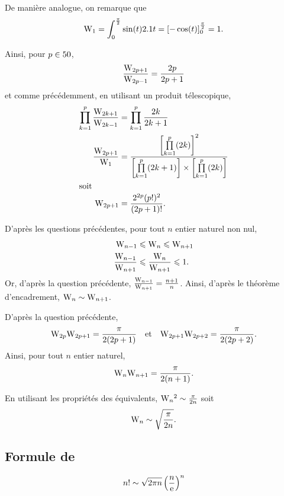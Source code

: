 \begin{solution}
\begin{reponses}
\item De manière analogue, on remarque que
\[
\mathrm{W}_1
= \int_0^{\frac{\pi}{2}} \sin(t) 2.1 t
= \left[-\cos(t)\right]_0^{\frac{\pi}{2}}
= 1.
\]

Ainsi, pour $p \in 50$,
\[
\frac{\mathrm{W}_{2p+1}}{\mathrm{W}_{2p-1}} = \frac{2p}{2p+1}
\]
et comme précédemment, en utilisant un produit télescopique, 
\begin{align*}
\prod_{k=1}^p \frac{\mathrm{W}_{2k+1}}{\mathrm{W}_{2k-1}} &= \prod_{k=1}^p \frac{2k}{2k+1}\\
\frac{\mathrm{W}_{2p+1}}{\mathrm{W}_1} &= \frac{\left[\prod\limits_{k=1}^p (2k)\right]^2}{\left[\prod\limits_{k=1}^p (2k+1)\right] \times \left[\prod\limits_{k=1}^p (2k)\right]}\\
\intertext{soit}
\mathrm{W}_{2p+1} &= \frac{2^{2p} (p!)^2}{(2p+1)!}.
\end{align*}

\item D'après les questions précédentes, pour tout $n$ entier naturel non nul,
\begin{align*}
\mathrm{W}_{n-1} &\leqslant \mathrm{W}_n \leqslant \mathrm{W}_{n+1}\\
\frac{\mathrm{W}_{n-1}}{\mathrm{W}_{n+1}} &\leqslant \frac{\mathrm{W}_n}{\mathrm{W}_{n+1}} \leqslant 1.
\end{align*}
Or, d'après la question précédente, $\frac{\mathrm{W}_{n-1}}{\mathrm{W}_{n+1}} = \frac{n+1}{n}$. Ainsi, d'après le théorème d'encadrement, $\mathrm{W}_n \sim \mathrm{W}_{n+1}$.

\item D'après la question précédente,
\[
\mathrm{W}_{2p} \mathrm{W}_{2p+1} = \frac{\pi}{2 (2 p + 1)}
\quad \text{et} \quad
\mathrm{W}_{2p+1} \mathrm{W}_{2p+2} = \frac{\pi}{2 (2p+2)}.
\]
Ainsi, pour tout $n$ entier naturel,
\[
\mathrm{W}_n \mathrm{W}_{n+1} = \frac{\pi}{2 (n + 1)}.
\]

\item En utilisant les propriétés des équivalents, $\mathrm{W}_n{}^2 \sim \frac{\pi}{2 n}$ soit
\[
\mathrm{W}_n \sim \sqrt{\frac{\pi}{2 n}}.
\]
\end{reponses}
\end{solution}

\subsection{Formule de } \label{preuve_stirling}


\begin{theo}
\[
n! \sim \sqrt{2 \pi n} \left(\frac{n}{\mathrm{e}}\right)^n
\]
\end{theo}

